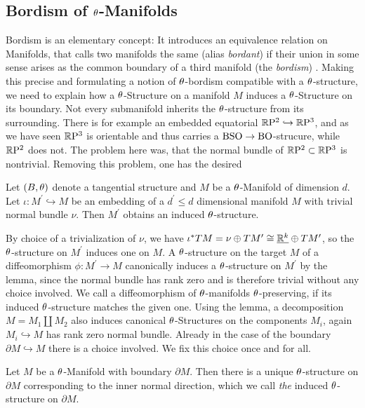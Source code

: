 \subsection{Bordism of $\theta$-Manifolds}
Bordism is an elementary concept: 
It introduces an equivalence relation on Manifolds, that calls two manifolds the same (alias \emph{bordant}) if their union in some sense arises as the common boundary of a third manifold (the \emph{bordism}) .
Making this precise and formulating a notion of $\theta$-bordism compatible with a $\theta$-structure, we need to explain how a $\theta$-Structure on a manifold $M$ induces a $\theta$-Structure on its boundary. 
Not every submanifold inherits the $\theta$-structure from its surrounding.
There is for example an embedded equatorial $\mathbb{R}\mathrm{P}^2 \hookrightarrow \mathbb{R}\mathrm{P}^3$, and as we have seen $\mathbb{R}\mathrm{P}^3$ is orientable and thus carries a $\mathrm{BSO}\to\mathrm{BO}$-strucure, while $\mathbb{R}\mathrm{P}^2$ does not. 
The problem here was, that the normal bundle of $\mathbb{R}\mathrm{P}^2 \subset \mathbb{R}\mathrm{P}^3$ is nontrivial.
Removing this problem, one has the desired
\begin{thesislemma}
Let $(B,\theta)$ denote a tangential structure and $M$ be a $\theta$-Manifold of dimension $d$. 
Let $\iota\colon M^\prime \hookrightarrow M$ be an embedding of a $d^\prime \leq d$ dimensional manifold $M$ with trivial normal bundle $\nu$.
Then $M^\prime$ obtains an induced $\theta$-structure.
\end{thesislemma}
\prf
By choice of a trivialization of $\nu$, we have $\iota^\ast TM= \nu \oplus TM^\prime \cong \underline{\mathbb{R}^k}\oplus TM^\prime$, so the $\theta$-structure on $M^\prime$ induces one on $M$.
\endprf
A $\theta$-structure on the target $M$ of a diffeomorphism $\phi \colon M^\prime \to M$ canonically induces a $\theta$-structure on $M^\prime$ by the lemma, since the normal bundle has rank zero and is therefore trivial without any choice involved.
We call a diffeomorphism of $\theta$-manifolds $\theta$-preserving, if its induced $\theta$-structure matches the given one.
Using the lemma, a decomposition $M = M_1 \amalg M_2$ also induces canonical $\theta$-Structures on the components $M_i$, again $M_i \hookrightarrow M$ has rank zero normal bundle.
Already in the case of the boundary $\partial M\hookrightarrow M$ there is a choice involved. 
We fix this choice once and for all.
\begin{defi}
    Let $M$ be a $\theta$-Manifold with boundary $\partial M$.
    Then there is a unique $\theta$-structure on $\partial M$ corresponding to the inner normal direction, which we call \emph{the} induced $\theta$-structure on $\partial M$.
\end{defi}
